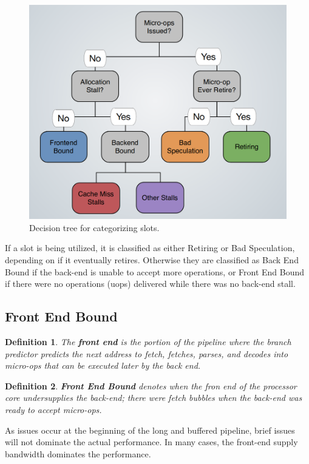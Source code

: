 \documentclass[11pt]{article}
\newtheorem{defn}{Definition}
\begin{document}
\begin{figure}[htb!]
  \centering
  \caption{Decision tree for categorizing slots.}
  \includegraphics[scale=0.3]{tmam}
\end{figure}

If a slot is being utilized, it is classified as either Retiring or Bad Speculation, depending on if it eventually retires.
Otherwise they are classified as Back End Bound if the back-end is unable to accept more operations, or Front End Bound if there were no operations (uops) delivered while there was no back-end stall.

\subsection{Front End Bound}
\begin{defn}
  The \textbf{front end} is the portion of the pipeline where the branch predictor predicts the next address to fetch, fetches, parses, and decodes into micro-ops that can be executed later by the back end.
\end{defn}

\begin{defn}
  \textbf{Front End Bound} denotes when the fron end of the processor core undersupplies the back-end; there were fetch bubbles when the back-end was ready to accept micro-ops.
\end{defn}

As issues occur at the beginning of the long and buffered pipeline, brief issues will not dominate the actual performance.
In many cases, the front-end supply bandwidth dominates the performance.
\end{document}

